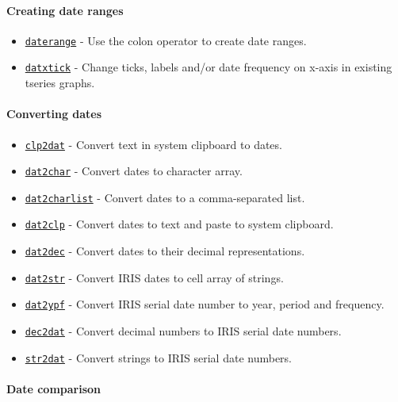 \paragraph{Creating date ranges}\label{creating-date-ranges}

\begin{itemize}
\itemsep1pt\parskip0pt
\item
  \href{dates/daterange}{\texttt{daterange}} - Use the colon operator to
  create date ranges.
\item
  \href{dates/datxtick}{\texttt{datxtick}} - Change ticks, labels and/or
  date frequency on x-axis in existing tseries graphs.
\end{itemize}

\paragraph{Converting dates}\label{converting-dates}

\begin{itemize}
\itemsep1pt\parskip0pt
\item
  \href{dates/clp2dat}{\texttt{clp2dat}} - Convert text in system
  clipboard to dates.
\item
  \href{dates/dat2char}{\texttt{dat2char}} - Convert dates to character
  array.
\item
  \href{dates/dat2charlist}{\texttt{dat2charlist}} - Convert dates to a
  comma-separated list.
\item
  \href{dates/dat2clp}{\texttt{dat2clp}} - Convert dates to text and
  paste to system clipboard.
\item
  \href{dates/dat2dec}{\texttt{dat2dec}} - Convert dates to their
  decimal representations.
\item
  \href{dates/dat2str}{\texttt{dat2str}} - Convert IRIS dates to cell
  array of strings.
\item
  \href{dates/dat2ypf}{\texttt{dat2ypf}} - Convert IRIS serial date
  number to year, period and frequency.
\item
  \href{dates/dec2dat}{\texttt{dec2dat}} - Convert decimal numbers to
  IRIS serial date numbers.
\item
  \href{dates/str2dat}{\texttt{str2dat}} - Convert strings to IRIS
  serial date numbers.
\end{itemize}

\paragraph{Date comparison}\label{date-comparison}

